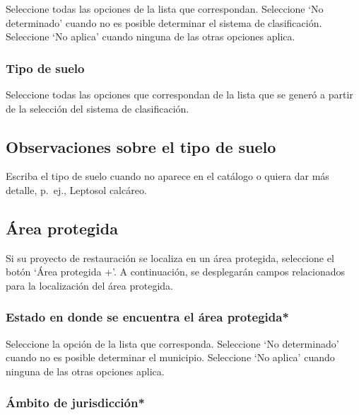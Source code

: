 \documentclass[
]{book}
\begin{document}
Seleccione todas las opciones de la lista que correspondan.
Seleccione `No determinado' cuando no es posible determinar el sistema de clasificación.
Seleccione `No aplica' cuando ninguna de las otras opciones aplica.

\hypertarget{tipo-de-suelo-1}{%
\subsubsection{Tipo de suelo}\label{tipo-de-suelo-1}}

Seleccione todas las opciones que correspondan de la lista que se generó a partir de la selección del sistema de clasificación.

\hypertarget{observaciones-sobre-el-tipo-de-suelo}{%
\subsection{Observaciones sobre el tipo de suelo}\label{observaciones-sobre-el-tipo-de-suelo}}

Escriba el tipo de suelo cuando no aparece en el catálogo o quiera dar más detalle, p.~ej., Leptosol calcáreo.

\hypertarget{uxe1rea-protegida}{%
\subsection{Área protegida}\label{uxe1rea-protegida}}

Si su proyecto de restauración se localiza en un área protegida, seleccione el botón `Área protegida +'. A continuación, se desplegarán campos relacionados para la localización del área protegida.

\hypertarget{estado-en-donde-se-encuentra-el-uxe1rea-protegida}{%
\subsubsection{Estado en donde se encuentra el área protegida*}\label{estado-en-donde-se-encuentra-el-uxe1rea-protegida}}

Seleccione la opción de la lista que corresponda.
Seleccione `No determinado' cuando no es posible determinar el municipio.
Seleccione `No aplica' cuando ninguna de las otras opciones aplica.

\hypertarget{uxe1mbito-de-jurisdicciuxf3n}{%
\subsubsection{Ámbito de jurisdicción*}\label{uxe1mbito-de-jurisdicciuxf3n}}
\end{document}
